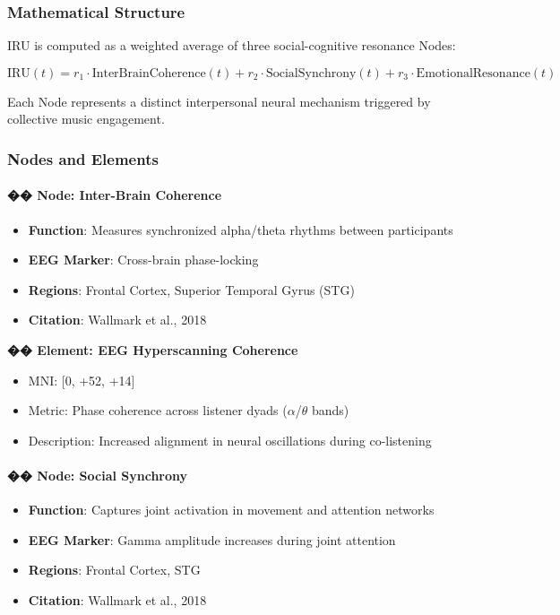 \subsubsection*{Mathematical Structure}

IRU is computed as a weighted average of three social-cognitive resonance Nodes:

\[
\text{IRU}(t) = r_1 \cdot \text{InterBrainCoherence}(t) + r_2 \cdot \text{SocialSynchrony}(t) + r_3 \cdot \text{EmotionalResonance}(t)
\]

Each Node represents a distinct interpersonal neural mechanism triggered by collective music engagement.

\subsubsection*{Nodes and Elements}

\paragraph{�� Node: Inter-Brain Coherence}

\begin{itemize}
    \item \textbf{Function}: Measures synchronized alpha/theta rhythms between participants
    \item \textbf{EEG Marker}: Cross-brain phase-locking
    \item \textbf{Regions}: Frontal Cortex, Superior Temporal Gyrus (STG)
    \item \textbf{Citation}: Wallmark et al., 2018
\end{itemize}

\textbf{�� Element: EEG Hyperscanning Coherence}

\begin{itemize}
    \item MNI: [0, +52, +14]
    \item Metric: Phase coherence across listener dyads ($\alpha$/$\theta$ bands)
    \item Description: Increased alignment in neural oscillations during co-listening
\end{itemize}

\paragraph{�� Node: Social Synchrony}

\begin{itemize}
    \item \textbf{Function}: Captures joint activation in movement and attention networks
    \item \textbf{EEG Marker}: Gamma amplitude increases during joint attention
    \item \textbf{Regions}: Frontal Cortex, STG
    \item \textbf{Citation}: Wallmark et al., 2018
\end{itemize}

